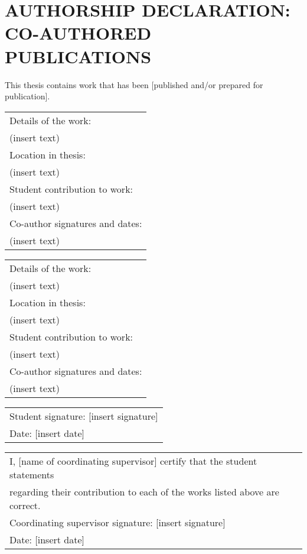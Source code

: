 \section*{AUTHORSHIP DECLARATION: CO-AUTHORED PUBLICATIONS}
\begin{flushleft}
This thesis contains work that has been [published and/or prepared for publication]. 
\vskip 0.5cm
\begin{tabular}{l}
		Details of the work: \\
        (insert text)      \\ 
        Location in thesis: \\
        (insert text)      \\ 
        Student contribution to work: \\
        (insert text) \\
		Co-author signatures and dates: \\
        (insert text)
\end{tabular} 
\vskip 0.5cm
\begin{tabular}{l}
		Details of the work: \\
        (insert text)      \\ 
        Location in thesis: \\
        (insert text)      \\ 
        Student contribution to work: \\
        (insert text) \\
		Co-author signatures and dates: \\
        (insert text)
\end{tabular} 
\vskip 0.5cm
\begin{tabular}{l}
Student signature: [insert signature] \\
Date: [insert date]\\
\end{tabular}
\vskip 0.5cm
\begin{tabular}{l}
I, [name of coordinating supervisor] certify that the student statements \\ regarding their contribution to each of the works listed above are correct. \\
Coordinating supervisor signature: [insert signature]\\
Date: [insert date]
\end{tabular}
\end{flushleft}

